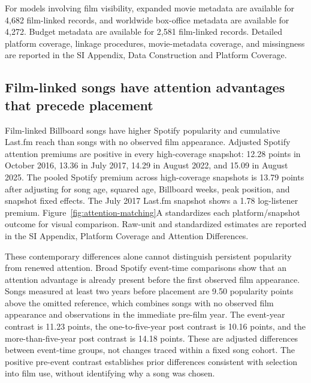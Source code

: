 \documentclass[10pt]{article}
\begin{document}
For models involving film visibility, expanded movie metadata are available for 4,682 film-linked records, and worldwide box-office metadata are available for 4,272. Budget metadata are available for 2,581 film-linked records. Detailed platform coverage, linkage procedures, movie-metadata coverage, and missingness are reported in the SI Appendix, Data Construction and Platform Coverage.





\subsection*{Film-linked songs have attention advantages that precede placement}

Film-linked Billboard songs have higher Spotify popularity and cumulative Last.fm reach than songs with no observed film appearance. Adjusted Spotify attention premiums are positive in every high-coverage snapshot: 12.28 points in October 2016, 13.36 in July 2017, 14.29 in August 2022, and 15.09 in August 2025. The pooled Spotify premium across high-coverage snapshots is 13.79 points after adjusting for song age, squared age, Billboard weeks, peak position, and snapshot fixed effects. The July 2017 Last.fm snapshot shows a 1.78 log-listener premium. Figure~\ref{fig:attention-matching}A standardizes each platform/snapshot outcome for visual comparison. Raw-unit and standardized estimates are reported in the SI Appendix, Platform Coverage and Attention Differences.

These contemporary differences alone cannot distinguish persistent popularity from renewed attention. Broad Spotify event-time comparisons show that an attention advantage is already present before the first observed film appearance. Songs measured at least two years before placement are 9.50 popularity points above the omitted reference, which combines songs with no observed film appearance and observations in the immediate pre-film year. The event-year contrast is 11.23 points, the one-to-five-year post contrast is 10.16 points, and the more-than-five-year post contrast is 14.18 points. These are adjusted differences between event-time groups, not changes traced within a fixed song cohort. The positive pre-event contrast establishes prior differences consistent with selection into film use, without identifying why a song was chosen.
\end{document}
